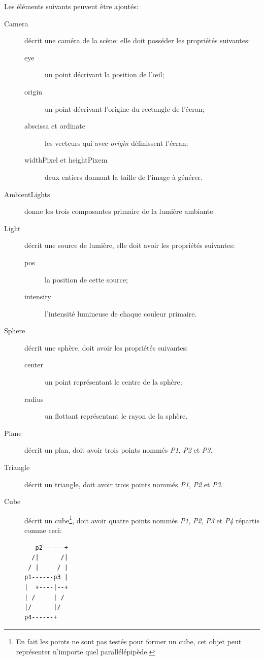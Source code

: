 \documentclass[a4paper]{article}
\begin{document}
    Les éléments suivants peuvent être ajoutés:
    \begin{description}
      \item[Camera] décrit une caméra de la scène: elle doit posséder les
        propriétés suivantes:
        \begin{description}
          \item[eye] un point décrivant la position de l'œil;
          \item[origin] un point décrivant l'origine du rectangle de l'écran;
          \item[abscissa et ordinate] les vecteurs qui avec \textit{origin}
            définissent l'écran;
          \item[widthPixel et heightPixem] deux entiers donnant la taille de
            l'image à générer. 
        \end{description}
      \item[AmbientLights] donne les trois composantes primaire de la lumière
        ambiante.
      \item[Light] décrit une source de lumière, elle doit avoir les propriétés
        suivantes:
        \begin{description}
          \item[pos] la position de cette source;
          \item[intensity] l'intensité lumineuse de chaque couleur primaire.
        \end{description}
      \item[Sphere] décrit une sphère, doit avoir les propriétés suivantes:
        \begin{description}
          \item[center] un point représentant le centre de la sphère;
          \item[radius] un flottant représentant le rayon de la sphère.
        \end{description}
      \item[Plane] décrit un plan, doit avoir trois points nommés \textit{P1},
        \textit{P2} et \textit{P3}.
      \item[Triangle] décrit un triangle, doit avoir trois points nommés
        \textit{P1}, \textit{P2} et \textit{P3}.
      \item[Cube] décrit un cube\footnote{En fait les points ne sont pas testés
        pour former un cube, cet objet peut représenter n'importe quel
        parallélépipède.}, doit avoir quatre points nommés
        \textit{P1}, \textit{P2}, \textit{P3} et \textit{P4} répartis comme
        ceci: \begin{lstlisting}
   p2------+
  /|      /|
 / |     / |
p1------p3 |
|  +----|--+
| /     | /
|/      |/
p4------+
        \end{lstlisting}
    \end{description}
\end{document}

